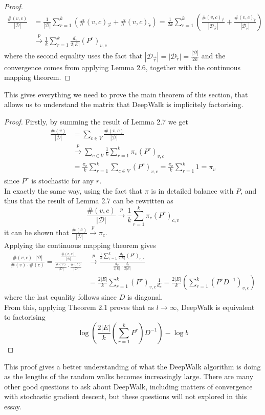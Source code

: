 \documentclass[a4paper]{article}
\newcommand{\D}{\mathcal D}
\newcommand{\rar}{\overrightarrow r}
\newcommand{\lar}{\overleftarrow r}
\begin{document}
\begin{proof}
  \begin{align*}
    \frac{\#(v, c)}{|\D|} &=  \frac{1}{|\D|}\sum_{r=1}^k (\#(v, c)_{\rar} + \#(v, c)_{\lar})= \frac{1}{2k} \sum_{r=1}^k \left( \frac{\#(v, c)_{\rar}}{|\D_{\rar}|} + \frac{\#(v, c)_{\lar}}{|\D_{\lar}|} \right)\\
                          &\overset{p}{\longrightarrow} \frac{1}{k}\sum_{r=1}^{k} \frac{d_v}{2|E|}(P^r)_{v, c}
  \end{align*}
  where the second equality uses the fact that $|\D_{\rar}| = |\D_{\lar}| =
  \frac{|\D|}{2k}$ and the convergence comes from applying Lemma 2.6,
  together with the continuous mapping theorem.
\end{proof}
This gives everything we need to prove the main theorem of this section, that
allows us to understand the matrix that DeepWalk is implicitely factorising.
\MainDeepWalk*
\begin{proof}
  Firstly, by summing the result of Lemma 2.7 we get
  \begin{align*}
    \frac{\#(v)}{|\D|} &= \sum_{c \in V}\frac{\#(v, c)}{|\D|}\\
                       &\overset{p}{\longrightarrow} \sum_{c \in V} \frac{1}{k}\sum_{r=1}^k \pi_v(P^r)_{v, c}\\
                       &=\frac{\pi_v}{k}\sum_{r = 1}^k \sum_{c \in V}(P^r)_{v,c} = \frac{\pi_v}{k}\sum_{r = 1}^k 1 = \pi_v
  \end{align*}
  since $P^r$ is stochastic for any $r$.\\
In exactly the same way, using the fact that $\pi$ is in detailed balance with $P$, and thus that
  the result of Lemma 2.7 can be rewritten as
  \[\frac{\#(v, c)}{|\D|} \overset{p}{\longrightarrow} \frac{1}{k} \sum_{r = 1}^k \pi_c
    (P^r)_{c,v}\]
  it can be shown that $\frac{\#(c)}{|\D|} \overset{p}{\longrightarrow} \pi_c$.\\
  Applying the continuous mapping theorem gives
  \begin{align*}
    \frac{\#(v, c) \cdot |\D|}{\#(v) \cdot \#(c)} = \frac{\frac{\#(v,c)}{|\D|}}{\frac{\#(v)}{|\D|} \cdot \frac{\#(c)}{|\D|}} & \overset{p}{\longrightarrow} \frac{\frac{1}{k}\sum_{r=1}^{k} \frac{d_v}{2|E|}(P^r)_{v, c}}{\frac{d_v}{2|E|} \cdot \frac{d_c}{2|E|}}\\
                                                                                                                             &=\frac{2|E|}{k}\sum_{r=1}^k (P^r)_{v,c} \frac{1}{d_c} = \frac{2|E|}{k}\left( \sum_{r=1}^k(P^rD^{-1})_{v,c} \right)
  \end{align*}
  where the last equality follows since $D$ is diagonal.\\
  From this, applying Theorem 2.1 proves that as $l \to \infty$, DeepWalk is equivalent to
  factorising
  \[\log \left( \frac{2|E|}{k}\left( \sum_{r=1}^k P^r \right)D^{-1}\right) - \log{b}\]
\end{proof}
\noindent This proof gives a better understanding of what the DeepWalk algorithm is doing as the lengths of the random walks becomes increasingly large.
There are many other good questions to ask about DeepWalk, including matters of convergence with stochastic gradient descent, but
these questions will not explored in this essay.
\end{document}
